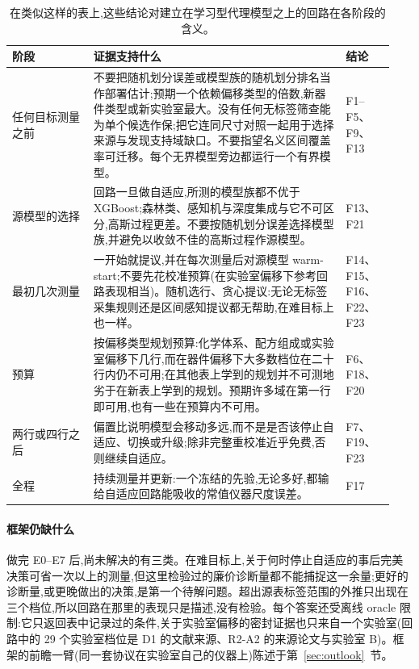 \documentclass[11pt,a4paper]{ctexart}
\begin{document}
\begin{table}[htbp]
\centering\footnotesize
\caption{在类似这样的表上,这些结论对建立在学习型代理模型之上的回路在各阶段的含义。}
\label{tab:loopguide}
\begin{tabular}{@{}p{0.2\linewidth}p{0.62\linewidth}p{0.12\linewidth}@{}}
\toprule
阶段 & 证据支持什么 & 结论 \\
\midrule
任何目标测量之前 & 不要把随机划分误差或模型族的随机划分排名当作部署估计;预期一个依赖偏移类型的倍数,新器件类型或新实验室最大。没有任何无标签筛查能为单个候选作保;把它连同尺寸对照一起用于选择来源与发现支持域缺口。不要指望名义区间覆盖率可迁移。每个无界模型旁边都运行一个有界模型。 & F1--F5、F9、F13 \\
源模型的选择 & 回路一旦做自适应,所测的模型族都不优于 XGBoost;森林类、感知机与深度集成与它不可区分,高斯过程更差。不要按随机划分误差选择模型族,并避免以收敛不佳的高斯过程作源模型。 & F13、F21 \\
最初几次测量 & 一开始就提议,并在每次测量后对源模型 warm-start;不要先花校准预算(在实验室偏移下参考回路表现相当)。随机选行、贪心提议:无论无标签采集规则还是区间感知提议都无帮助,在难目标上也一样。 & F14、F15、F16、F22、F23 \\
预算 & 按偏移类型规划预算:化学体系、配方组成或实验室偏移下几行,而在器件偏移下大多数档位在二十行内仍不可用;在其他表上学到的规划并不可测地劣于在新表上学到的规划。预期许多域在第一行即可用,也有一些在预算内不可用。 & F6、F18、F20 \\
两行或四行之后 & 偏置比说明模型会移动多远,而不是是否该停止自适应、切换或升级;除非完整重校准近乎免费,否则继续自适应。 & F7、F19、F23 \\
全程 & 持续测量并更新:一个冻结的先验,无论多好,都输给自适应回路能吸收的常值仪器尺度误差。 & F17 \\
\bottomrule
\end{tabular}
\end{table}

\paragraph{框架仍缺什么} 做完 E0--E7 后,尚未解决的有三类。在难目标上,关于何时停止自适应的事后完美决策可省一次以上的测量,但这里检验过的廉价诊断量都不能捕捉这一余量;更好的诊断量,或更晚做出的决策,是第一个待解问题。超出源表标签范围的外推只出现在三个档位,所以回路在那里的表现只是描述,没有检验。每个答案还受离线 oracle 限制:它只返回表中记录过的条件,关于实验室偏移的密封证据也只来自一个实验室(回路中的 29 个实验室档位是 D1 的文献来源、R2-A2 的来源论文与实验室 B)。框架的前瞻一臂(同一套协议在实验室自己的仪器上)陈述于第~\ref{sec:outlook}~节。
\end{document}
